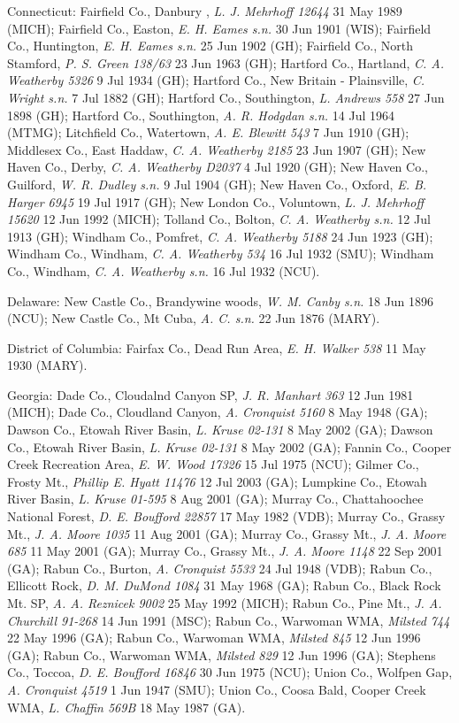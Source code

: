 \documentclass{article}
\begin{document}
Connecticut:
Fairfield Co., Danbury , \textit{L. J. Mehrhoff 12644} 31 May 1989 (MICH);
Fairfield Co., Easton, \textit{E. H. Eames s.n.} 30 Jun 1901 (WIS);
Fairfield Co., Huntington, \textit{E. H. Eames s.n.} 25 Jun 1902 (GH);
Fairfield Co., North Stamford, \textit{P. S. Green 138/63} 23 Jun 1963 (GH);
Hartford Co., Hartland, \textit{C. A. Weatherby 5326} 9 Jul 1934 (GH);
Hartford Co., New Britain - Plainsville, \textit{C. Wright s.n.} 7 Jul 1882 (GH);
Hartford Co., Southington, \textit{L. Andrews 558} 27 Jun 1898 (GH);
Hartford Co., Southington, \textit{A. R. Hodgdan s.n.} 14 Jul 1964 (MTMG);
Litchfield Co., Watertown, \textit{A. E. Blewitt 543} 7 Jun 1910 (GH);
Middlesex Co., East Haddaw, \textit{C. A. Weatherby 2185} 23 Jun 1907 (GH);
New Haven Co., Derby, \textit{C. A. Weatherby D2037} 4 Jul 1920 (GH);
New Haven Co., Guilford, \textit{W. R. Dudley s.n.} 9 Jul 1904 (GH);
New Haven Co., Oxford, \textit{E. B. Harger 6945} 19 Jul 1917 (GH);
New London Co., Voluntown, \textit{L. J. Mehrhoff 15620} 12 Jun 1992 (MICH);
Tolland Co., Bolton, \textit{C. A. Weatherby s.n.} 12 Jul 1913 (GH);
Windham Co., Pomfret, \textit{C. A. Weatherby 5188} 24 Jun 1923 (GH);
Windham Co., Windham, \textit{C. A. Weatherby 534} 16 Jul 1932 (SMU);
Windham Co., Windham, \textit{C. A. Weatherby s.n.} 16 Jul 1932 (NCU).

Delaware:
New Castle Co., Brandywine woods, \textit{W. M. Canby s.n.} 18 Jun 1896 (NCU);
New Castle Co., Mt Cuba, \textit{A. C. s.n.} 22 Jun 1876 (MARY).

District of Columbia:
Fairfax Co., Dead Run Area, \textit{E. H. Walker 538} 11 May 1930 (MARY).

Georgia:
Dade Co., Cloudalnd Canyon SP, \textit{J. R. Manhart 363} 12 Jun 1981 (MICH);
Dade Co., Cloudland Canyon, \textit{A. Cronquist 5160} 8 May 1948 (GA);
Dawson Co., Etowah River Basin, \textit{L. Kruse 02-131} 8 May 2002 (GA);
Dawson Co., Etowah River Basin, \textit{L. Kruse 02-131} 8 May 2002 (GA);
Fannin Co., Cooper Creek Recreation Area, \textit{E. W. Wood 17326} 15 Jul 1975 (NCU);
Gilmer Co., Frosty Mt., \textit{Phillip E. Hyatt 11476} 12 Jul 2003 (GA);
Lumpkine Co., Etowah River Basin, \textit{L. Kruse 01-595} 8 Aug 2001 (GA);
Murray Co., Chattahoochee National Forest, \textit{D. E. Boufford 22857} 17 May 1982 (VDB);
Murray Co., Grassy Mt., \textit{J. A. Moore 1035} 11 Aug 2001 (GA);
Murray Co., Grassy Mt., \textit{J. A. Moore 685} 11 May 2001 (GA);
Murray Co., Grassy Mt., \textit{J. A. Moore 1148} 22 Sep 2001 (GA);
Rabun Co., Burton, \textit{A. Cronquist 5533} 24 Jul 1948 (VDB);
Rabun Co., Ellicott Rock, \textit{D. M. DuMond 1084} 31 May 1968 (GA);
Rabun Co., Black Rock Mt. SP, \textit{A. A. Reznicek 9002} 25 May 1992 (MICH);
Rabun Co., Pine Mt., \textit{J. A. Churchill 91-268} 14 Jun 1991 (MSC);
Rabun Co., Warwoman WMA, \textit{Milsted 744} 22 May 1996 (GA);
Rabun Co., Warwoman WMA, \textit{Milsted 845} 12 Jun 1996 (GA);
Rabun Co., Warwoman WMA, \textit{Milsted 829} 12 Jun 1996 (GA);
Stephens Co., Toccoa, \textit{D. E. Boufford 16846} 30 Jun 1975 (NCU);
Union Co., Wolfpen Gap, \textit{A. Cronquist 4519} 1 Jun 1947 (SMU);
Union Co., Coosa Bald, Cooper Creek WMA, \textit{L. Chaffin 569B} 18 May 1987 (GA).
\end{document}
